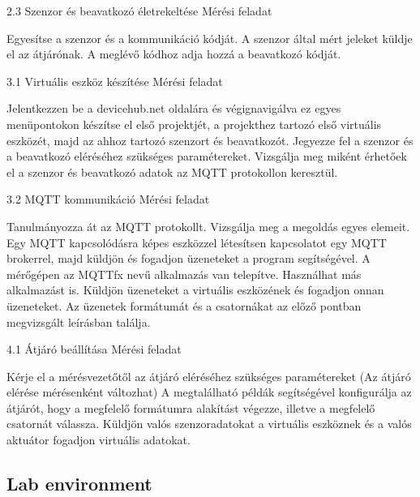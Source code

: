 \documentclass[a4paper]{article}
\begin{document}
2.3 Szenzor és beavatkozó életrekeltése
Mérési feladat

    Egyesítse a szenzor és a kommunikáció kódját. A szenzor által mért jeleket küldje el az átjárónak.
    A meglévő kódhoz adja hozzá a beavatkozó kódját.

3.1 Virtuális eszköz készítése
Mérési feladat

    Jelentkezzen be a devicehub.net oldalára és végignavigálva ez egyes menüpontokon készítse el első projektjét, a projekthez tartozó első virtuális eszközét, majd az ahhoz tartozó szenzort és beavatkozót.
    Jegyezze fel a szenzor és a beavatkozó eléréséhez szükséges paramétereket.
    Vizsgálja meg miként érhetőek el a szenzor és beavatkozó adatok az MQTT protokollon keresztül.

3.2 MQTT kommunikáció
Mérési feladat

    Tanulmányozza át az MQTT protokollt. Vizsgálja meg a megoldás egyes elemeit.
    Egy MQTT kapcsolódásra képes eszközzel létesítsen kapcsolatot egy MQTT brokerrel, majd küldjön és fogadjon üzeneteket a program segítségével. A mérőgépen az MQTTfx nevű alkalmazás van telepítve. Használhat más alkalmazást is.
    Küldjön üzeneteket a virtuális eszközének és fogadjon onnan üzeneteket. Az üzenetek formátumát és a csatornákat az előző pontban megvizsgált leírásban találja.

4.1 Átjáró beállítása
Mérési feladat

    Kérje el a mérésvezetőtől az átjáró eléréséhez szükséges paramétereket (Az átjáró elérése mérésenként változhat)
    A megtalálható példák segítségével konfigurálja az átjárót, hogy a megfelelő formátumra alakítást végezze, illetve a megfelelő csatornát válassza.
    Küldjön valós szenzoradatokat a virtuális eszköznek és a valós aktuátor fogadjon virtuális adatokat.

\subsection{Lab environment}
\end{document}
